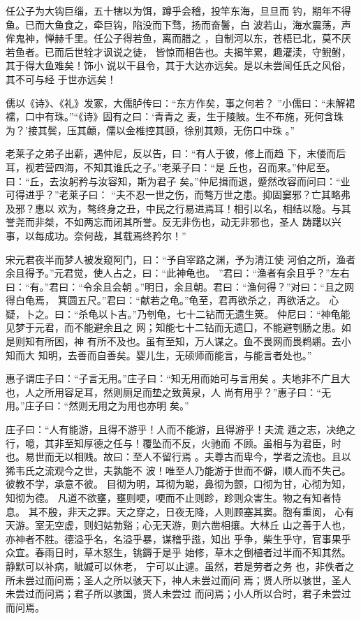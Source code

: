 \documentclass[12pt,UTF8]{ctexbook}
\begin{document}
任公子为大钩巨缁，五十犗以为饵，蹲乎会稽，投竿东海，旦旦而 钓，期年不得鱼。已而大鱼食之，牵巨钩，陷没而下骛，扬而奋鬐，白 波若山，海水震荡，声侔鬼神，惮赫千里。任公子得若鱼，离而腊之 ，自制河以东，苍梧已北，莫不厌若鱼者。已而后世辁才讽说之徒， 皆惊而相告也。夫揭竿累，趣灌渎，守鲵鲋，其于得大鱼难矣！饰小 说以干县令，其于大达亦远矣。是以未尝闻任氏之风俗，其不可与经 于世亦远矣！

儒以《诗》、《礼》发冢，大儒胪传曰：“东方作矣，事之何若？ ”小儒曰：“未解裙襦，口中有珠。”“《诗》固有之曰：‘青青之 麦，生于陵陂。生不布施，死何含珠为？’接其鬓，压其顪，儒以金椎控其颐，徐别其颊，无伤口中珠 。”

老莱子之弟子出薪，遇仲尼，反以告，曰：“有人于彼，修上而趋 下，末偻而后耳，视若营四海，不知其谁氏之子。”老莱子曰：“是 丘也，召而来。”仲尼至。曰：“丘，去汝躬矜与汝容知，斯为君子 矣。”仲尼揖而退，蹙然改容而问曰：“业可得进乎？”老莱子曰： “夫不忍一世之伤，而骜万世之患。抑固窭邪？亡其略弗及邪？惠以 欢为，骜终身之丑，中民之行易进焉耳！相引以名，相结以隐。与其 誉尧而非桀，不如两忘而闭其所誉。反无非伤也，动无非邪也，圣人 踌躇以兴事，以每成功。奈何哉，其载焉终矜尔！”

宋元君夜半而梦人被发窥阿门，曰：“予自宰路之渊，予为清江使 河伯之所，渔者余且得予。”元君觉，使人占之，曰：“此神龟也。 ”君曰：“渔者有余且乎？”左右曰：“有。”君曰：“令余且会朝 。”明日，余且朝。君曰：“渔何得？”对曰：“且之网得白龟焉， 箕圆五尺。”君曰：“献若之龟。”龟至，君再欲杀之，再欲活之。 心疑，卜之。曰：“杀龟以卜吉。”乃刳龟，七十二钻而无遗生筴。 仲尼曰：“神龟能见梦于元君，而不能避余且之 网；知能七十二钻而无遗囗，不能避刳肠之患。如是则知有所困，神 有所不及也。虽有至知，万人谋之。鱼不畏网而畏鹈鹕。去小知而大 知明，去善而自善矣。婴儿生，无硕师而能言，与能言者处也。”

惠子谓庄子曰：“子言无用。”庄子曰：“知无用而始可与言用矣 。夫地非不广且大也，人之所用容足耳，然则厕足而垫之致黄泉，人 尚有用乎？”惠子曰：“无用。”庄子曰：“然则无用之为用也亦明 矣。”

庄子曰：“人有能游，且得不游乎！人而不能游，且得游乎！夫流 遁之志，决绝之行，噫，其非至知厚德之任与！覆坠而不反，火驰而 不顾。虽相与为君臣，时也。易世而无以相贱。故曰：至人不留行焉 。夫尊古而卑今，学者之流也。且以狶韦氏之流观今之世，夫孰能不 波！唯至人乃能游于世而不僻，顺人而不失己。彼教不学，承意不彼。 目彻为明，耳彻为聪，鼻彻为颤，口彻为甘，心彻为知，知彻为德。 凡道不欲壅，壅则哽，哽而不止则跈，跈则众害生。物之有知者恃息。 其不殷，非天之罪。天之穿之，日夜无降，人则顾塞其窦。胞有重阆， 心有天游。室无空虚，则妇姑勃谿；心无天游，则六凿相攘。大林丘 山之善于人也，亦神者不胜。德溢乎名，名溢乎暴，谋稽乎誸，知出 乎争，柴生乎守，官事果乎众宜。春雨日时，草木怒生，铫鎒于是乎 始修，草木之倒植者过半而不知其然。静默可以补病，眦媙可以休老， 宁可以止遽。虽然，若是劳者之务 也，非佚者之所未尝过而问焉；圣人之所以骇天下，神人未尝过而问 焉；贤人所以骇世，圣人未尝过而问焉；君子所以骇国，贤人未尝过 而问焉；小人所以合时，君子未尝过而问焉。
\end{document}
